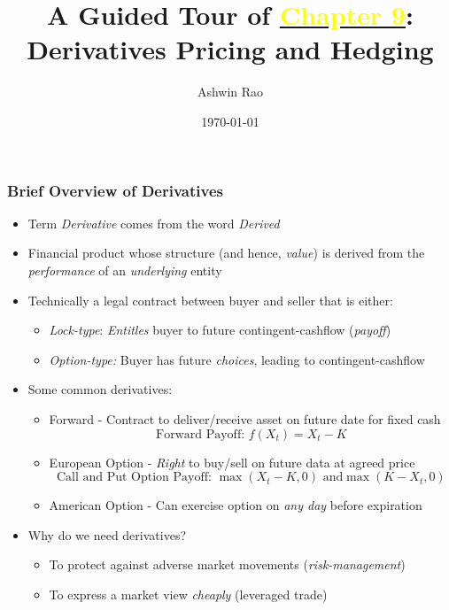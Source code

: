 \documentclass[handout]{beamer}
\title[Derivatives Chapter]{A Guided Tour of \href{http://stanford.edu/~ashlearn/RLForFinanceBook/book.pdf}{\underline{\textcolor{yellow}{Chapter 9}}}: \\  Derivatives Pricing and Hedging}
\author{Ashwin Rao} %
\institute[Stanford] %
{
ICME, Stanford University
}
\date{\today} %
\begin{document}
\begin{frame}
\titlepage %
\end{frame}



\begin{frame}
\frametitle{Brief Overview of Derivatives}
\begin{itemize}[<+->]
\item Term {\em Derivative} comes from the word {\em Derived}
\item Financial product whose structure (and hence, {\em value}) is derived from the {\em performance} of an {\em underlying} entity
\item Technically a legal contract between buyer and seller that is either:
\begin{itemize}[<+->]
\item {\em Lock-type}: {\em Entitles} buyer to future contingent-cashflow ({\em payoff})
\item {\em Option-type:} Buyer has future {\em choices}, leading to contingent-cashflow
\end{itemize}
\item Some common derivatives:
\begin{itemize}[<+->]
\item Forward  - Contract to deliver/receive asset on future date for fixed cash
$$\text{Forward Payoff: } f(X_t) = X_t - K$$
\item European Option - {\em Right} to buy/sell on future data at agreed price
$$\text{Call and Put Option Payoff: } \max(X_t - K, 0) \text{ and} \max(K - X_t, 0)$$
\item American Option - Can exercise option on {\em any day} before expiration
\end{itemize}
\item Why do we need derivatives?
\begin{itemize}[<+->]
\item To protect against adverse market movements ({\em risk-management})
\item To express a market view {\em cheaply} (leveraged trade)
\end{itemize}
\end{itemize}
\end{frame}
\end{document}
